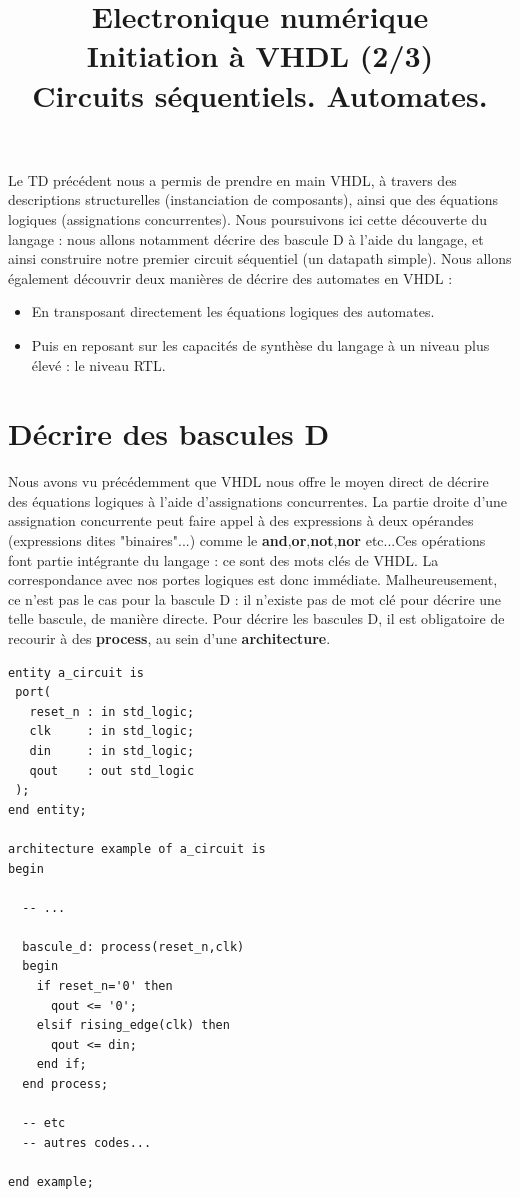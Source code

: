 \documentclass[a4paper,11pt]{article}
\title{{\Huge Electronique numérique}\\Initiation à VHDL (2/3)\\Circuits séquentiels. Automates.}
\date{}
\begin{document}
\maketitle
Le TD précédent nous a permis de prendre en main VHDL, à travers des descriptions structurelles (instanciation de composants), ainsi que des équations logiques (assignations concurrentes).
 Nous poursuivons ici cette découverte du langage : nous allons notamment décrire des bascule D à l'aide du langage, et ainsi construire notre premier circuit séquentiel (un datapath simple).
Nous allons également découvrir deux manières de décrire des automates en VHDL :
\begin{itemize}
  \item En transposant directement les équations logiques des automates.
  \item Puis en reposant sur les capacités de synthèse du langage à un niveau plus élevé : le niveau RTL.
\end{itemize}

\section{Décrire des bascules D}
Nous avons vu précédemment que VHDL nous offre le moyen direct de décrire des équations logiques à l'aide d'assignations concurrentes. La partie droite d'une assignation concurrente peut
faire appel à des expressions à deux opérandes (expressions dites "binaires"...) comme le \textbf{and},\textbf{or},\textbf{not},\textbf{nor} etc...Ces opérations font partie intégrante
du langage : ce sont des mots clés de VHDL. La correspondance avec nos portes logiques
est donc immédiate. Malheureusement, ce n'est pas le cas pour la bascule D : il n'existe pas de mot clé pour décrire une telle bascule, de manière directe. Pour décrire les bascules D, il
est obligatoire de recourir à des \textbf{process}, au sein d'une \textbf{architecture}.

\begin{lstlisting}
entity a_circuit is
 port(
   reset_n : in std_logic;
   clk     : in std_logic;
   din     : in std_logic;
   qout    : out std_logic
 );
end entity;

architecture example of a_circuit is
begin

  -- ...

  bascule_d: process(reset_n,clk)
  begin
    if reset_n='0' then
      qout <= '0';
    elsif rising_edge(clk) then
      qout <= din;
    end if;
  end process;

  -- etc
  -- autres codes...

end example;

\end{lstlisting}
\end{document}
